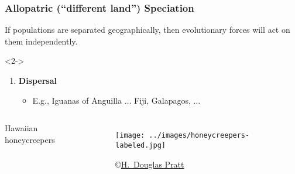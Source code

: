 \documentclass[14pt,table]{beamer}
\begin{document}
\begin{frame}[t]
    \frametitle{Allopatric (``different land'') Speciation}
    \vspace{-4mm}
    \begin{adjustwidth}{-1.5em}{-1.5em}
        If populations are separated geographically, then evolutionary forces
        will act on them independently.
        \begin{uncoverenv}<2->
        \begin{enumerate}
            \item \textbf{Dispersal}
                \begin{itemize}
                    \item E.g., Iguanas of Anguilla
                        $\ldots$ Fiji, Galapagos, $\ldots$
                \end{itemize}
        \end{enumerate}
        \end{uncoverenv}
    \end{adjustwidth}

\end{frame}

\begin{frame}[t]
    \begin{adjustwidth}{-1.5em}{-1.5em}
        \begin{columns}
            Hawaiian honeycreepers

            \begin{figure}
                \begin{center}
                    \texttt{[image: ../images/honeycreepers-labeled.jpg]}
                    \caption{\tiny \copyright \href{http://www.hdouglaspratt.com/}{H.\ Douglas Pratt}}
                \end{center}
            \end{figure}
        \end{columns}
    \end{adjustwidth}
\end{frame}
\end{document}
